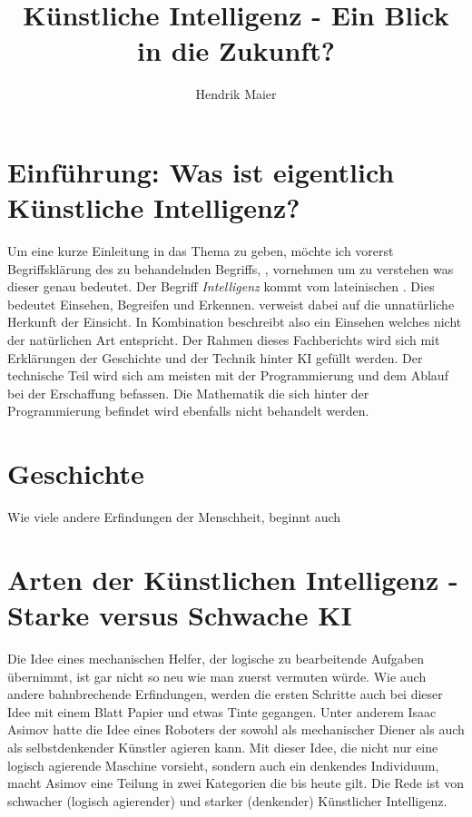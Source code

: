 \documentclass[12pt]{report}
\title{Künstliche Intelligenz - Ein Blick in die Zukunft?}
\author{Hendrik Maier}
\date{}
\begin{document}
    \maketitle

    \tableofcontents
    \newpage

    \section{Einführung: Was ist eigentlich Künstliche Intelligenz?}
    Um eine kurze Einleitung in das Thema zu geben, möchte ich vorerst Begriffsklärung des zu behandelnden Begriffs,
    , vornehmen um zu verstehen was dieser genau bedeutet.
    Der Begriff \emph{Intelligenz} kommt vom lateinischen . Dies bedeutet Einsehen, Begreifen und Erkennen.\cite{piaget2000psychologie}
     verweist dabei auf die unnatürliche Herkunft der Einsicht. In Kombination beschreibt 
    also ein Einsehen welches nicht der natürlichen Art entspricht. Der Rahmen dieses Fachberichts wird sich mit Erklärungen
    der Geschichte und der Technik hinter KI gefüllt werden. Der technische Teil wird sich am meisten
    mit der Programmierung und dem Ablauf bei der Erschaffung befassen. Die Mathematik die sich hinter
    der Programmierung befindet wird ebenfalls nicht behandelt werden.
    
    \section{Geschichte}
    Wie viele andere Erfindungen der Menschheit, beginnt auch

    \section{Arten der Künstlichen Intelligenz - Starke versus Schwache KI}
    Die Idee eines mechanischen Helfer, der logische zu bearbeitende Aufgaben übernimmt, ist gar nicht so neu wie man
    zuerst vermuten würde. Wie auch andere bahnbrechende Erfindungen, werden die ersten Schritte auch bei dieser Idee
    mit einem Blatt Papier und etwas Tinte gegangen. Unter anderem Isaac Asimov hatte die Idee
    eines Roboters der sowohl als mechanischer Diener als auch als selbstdenkender Künstler agieren kann.\cite{asimov2000der}
    Mit dieser Idee, die nicht nur eine logisch agierende Maschine vorsieht, sondern auch ein denkendes Individuum, macht Asimov
    eine Teilung in zwei Kategorien die bis heute gilt. Die Rede ist von schwacher (logisch agierender) und starker (denkender) Künstlicher Intelligenz.\\
\end{document}
